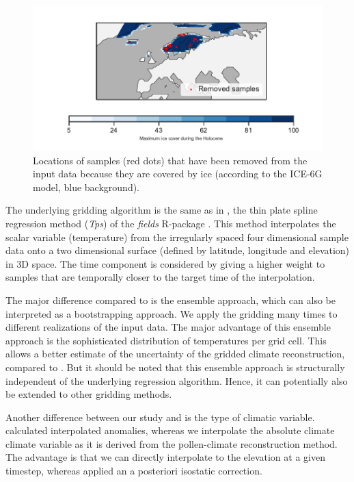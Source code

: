 \documentclass[
11pt, %
english, %
singlespacing, %
headsepline, %
]{MastersDoctoralThesis} %
\begin{document}
\begin{NoHyper}
\begin{refsection}
\begin{figure}
\includegraphics[width=\linewidth]{gridding-figures/elevation-mask.pdf}
\caption[Ice sheet mask of the pollen samples]{Locations of samples (red dots) that have been removed from the input data because they are covered by ice (according to the ICE-6G model, blue background).}
\label{fig:gridding-elev-mask}
\end{figure}

The underlying gridding algorithm is the same as in \cite{MauriDavisCollinsEtAl2015}, the thin plate spline regression method (\textit{Tps}) of the \textit{fields} R-package \citep{NychkaFurrerPaigeEtAl2017, RCT2019}. This method interpolates the scalar variable (temperature) from the irregularly spaced four dimensional sample data onto a two dimensional surface (defined by latitude, longitude and elevation) in 3D space. The time component is considered by giving a higher weight to samples that are temporally closer to the target time of the interpolation.

The major difference compared to \cite{MauriDavisCollinsEtAl2015} is the ensemble approach, which can also be interpreted as a bootstrapping approach. We apply the gridding many times to different realizations of the input data. The major advantage of this ensemble approach is the sophisticated distribution of temperatures per grid cell. This allows a better estimate of the uncertainty of the gridded climate reconstruction, compared to \cite{MauriDavisCollinsEtAl2015}. But it should be noted that this ensemble approach is structurally independent of the underlying regression algorithm. Hence, it can potentially also be extended to other gridding methods.

Another difference between our study and \cite{MauriDavisCollinsEtAl2015} is the type of climatic variable. \cite{MauriDavisCollinsEtAl2015} calculated interpolated anomalies, whereas we interpolate the absolute climate climate variable as it is derived from the pollen-climate reconstruction method. The advantage is that we can directly interpolate to the elevation at a given timestep, whereas \cite{MauriDavisCollinsEtAl2015} applied an a posteriori isostatic correction. 


\end{refsection}
\end{NoHyper}
\end{document}
